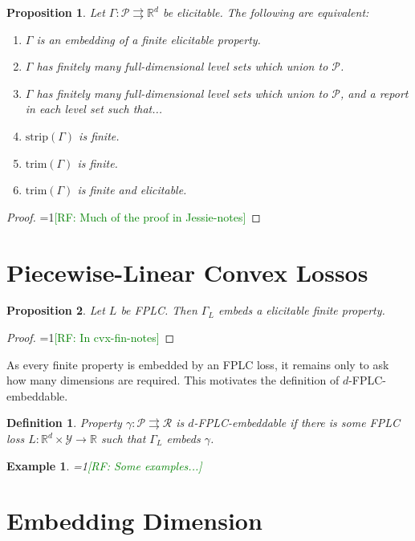 \documentclass[11pt]{article}
\newcommand{\Comments}{1}
\newcommand{\mynote}[2]{\ifnum\Comments=1\textcolor{#1}{#2}\fi}
\newcommand{\raf}[1]{\mynote{green}{[RF: #1]}}
\newcommand{\reals}{\mathbb{R}}
\renewcommand{\P}{\mathcal{P}}
\newcommand{\R}{\mathcal{R}}
\newcommand{\Y}{\mathcal{Y}}
\newcommand{\toto}{\rightrightarrows}
\newcommand{\trim}{\mathrm{trim}}
\newcommand{\strip}{\mathrm{strip}}
\newtheorem{proposition}{Proposition}
\newtheorem{definition}{Definition}
\newtheorem{example}{Example}
\begin{document}
\begin{proposition}
  Let $\Gamma:\P\toto\reals^d$ be elicitable.
  The following are equivalent:
  \begin{enumerate}
  \item $\Gamma$ is an embedding of a finite elicitable property.
  \item $\Gamma$ has finitely many full-dimensional level sets which union to $\P$.
  \item $\Gamma$ has finitely many full-dimensional level sets which union to $\P$, and a report in each level set such that...
  \item $\strip(\Gamma)$ is finite.
  \item $\trim(\Gamma)$ is finite.
  \item $\trim(\Gamma)$ is finite and elicitable.
  \end{enumerate}
\end{proposition}
\begin{proof}
  \raf{Much of the proof in Jessie-notes}
\end{proof}


\section{Piecewise-Linear Convex Lossos}

\begin{proposition}
  Let $L$ be FPLC.
  Then $\Gamma_L$ embeds a elicitable finite property.
\end{proposition}
\begin{proof}
  \raf{In cvx-fin-notes}
\end{proof}

As every finite property is embedded by an FPLC loss, it remains only to ask how many dimensions are required.
This motivates the definition of $d$-FPLC-embeddable.

\begin{definition}
  Property $\gamma:\P\toto\R$ is $d$-FPLC-embeddable if there is some FPLC loss $L:\reals^d\times\Y\to\reals$ such that $\Gamma_L$ embeds $\gamma$.
\end{definition}

\begin{example}
  \raf{Some examples...}
\end{example}

\section{Embedding Dimension}
\end{document}
